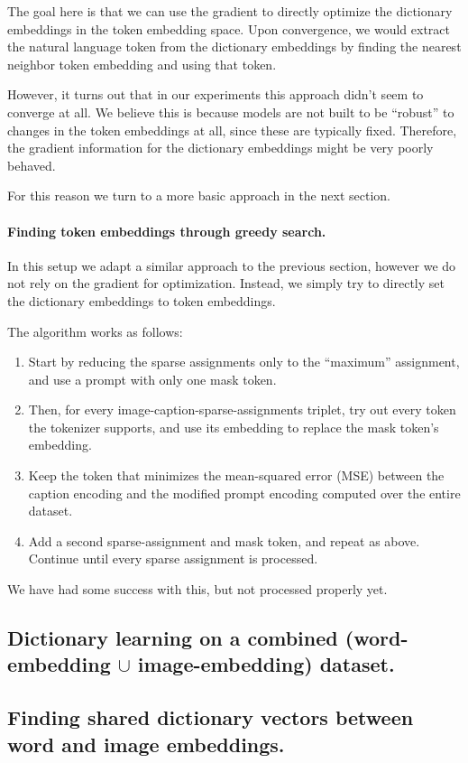 \documentclass[11pt]{article}
\begin{document}
The goal here is that we can use the gradient to directly optimize the dictionary embeddings in the token embedding space.
Upon convergence, we would extract the natural language token from the dictionary embeddings by finding the nearest neighbor token embedding and using that token.

However, it turns out that in our experiments this approach didn't seem to converge at all.
We believe this is because models are not built to be ``robust'' to changes in the token embeddings at all, since these are typically fixed.
Therefore, the gradient information for the dictionary embeddings might be very poorly behaved.

For this reason we turn to a more basic approach in the next section.
\paragraph{Finding token embeddings through greedy search.}
\label{sec:org4ffba54}
In this setup we adapt a similar approach to the previous section, however we do not rely on the gradient for optimization.
Instead, we simply try to directly set the dictionary embeddings to token embeddings.

The algorithm works as follows:
\begin{enumerate}
\item Start by reducing the sparse assignments only to the ``maximum'' assignment, and use a prompt with only one mask token.
\item Then, for every image-caption-sparse-assignments triplet, try out every token the tokenizer supports, and use its embedding to replace the mask token's embedding.
\item Keep the token that minimizes the mean-squared error (MSE) between the caption encoding and the modified prompt encoding computed over the entire dataset.
\item Add a second sparse-assignment and mask token, and repeat as above.
Continue until every sparse assignment is processed.
\end{enumerate}

We have had some success with this, but not processed properly yet.
\subsection{Dictionary learning on a combined (word-embedding \(\cup\) image-embedding) dataset.}
\label{sec:org550eec0}

\subsection{Finding shared dictionary vectors between word and image embeddings.}
\label{sec:org10f0d20}
\end{document}
